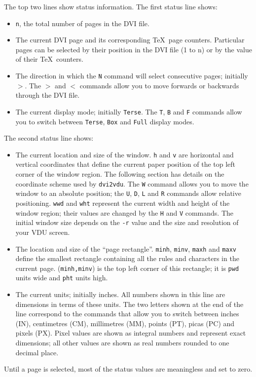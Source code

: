 The top two lines show status information.  The first status line shows:
\begin{itemize}
\item {\tt n}, the total number of pages in the DVI file.

\item The current DVI page and its corresponding \TeX\ page counters.
   Particular pages can be selected by their position in the DVI
   file (1 to n) or by the value of their \TeX\ counters.

\item The direction in which the {\tt N} command will select consecutive pages;
initially {\tt $>$}.  The {\tt $>$} and {\tt $<$} commands allow you to move
forwards or backwards through the DVI file.

\item The current display mode; initially {\tt Terse}.
   The {\tt T}, {\tt B} and {\tt F} commands allow you to switch between 
{\tt Terse}, {\tt Box} and
   {\tt Full} display modes.
\end{itemize}

The second status line shows:

\begin{itemize} \item The current location and size of the window. {\tt h} and
{\tt v} are horizontal and vertical coordinates that define the current paper
position of the top left corner of the window region. The following section has
details on the coordinate scheme used by {\tt dvi2vdu}.  The {\tt W} command allows
you to move the window to an absolute position; the {\tt U}, {\tt D}, {\tt L}
and {\tt R} commands allow relative positioning. {\tt wwd} and {\tt wht}
represent the current width and height of the window region; their values are
changed by the {\tt H} and {\tt V} commands. The initial window size depends on
the {\tt -r} value and the size and resolution of your VDU screen.

\item The location and size of the ``page rectangle''. {\tt minh}, {\tt minv},
{\tt maxh} and {\tt maxv} define the smallest rectangle containing all the
rules and characters in the current page. ({\tt minh,minv}) is the top left
corner of this rectangle; it is {\tt pwd} units wide and {\tt pht} units high.

\item The current units; initially inches.
   All numbers shown in this line are dimensions in terms of these units.
   The two letters shown at the end of the line correspond to the commands
   that allow you to switch between inches (IN),
   centimetres (CM), millimetres (MM), points (PT), picas (PC)
   and pixels (PX).
   Pixel values are shown as integral numbers and represent exact dimensions;
   all other values are shown as real numbers rounded to one decimal place.

\end{itemize}
Until a page is selected, most of the status values are
meaningless and set to zero.

